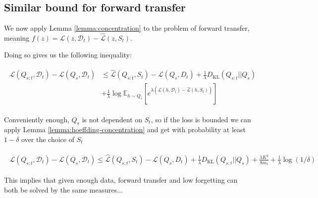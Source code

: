 \documentclass[letterpaper]{article}
\theoremstyle{definition}
\begin{document}
\subsection{Similar bound for forward transfer}

We now apply Lemma \ref{lemma:concentration} to the problem of forward transfer, meaning $f(z)=\mathcal{L}(z,\mathcal{D}_t)-\hat{\mathcal{L}}(z,S_t)$.

Doing so gives us the following inequality:

\begin{align}
\begin{split}
\mathcal{L}(Q_{s:t},\mathcal{D}_t) - \mathcal{L}(Q_{s},\mathcal{D}_t) &\leq \hat{\mathcal{L}}(Q_{s:t}, S_t) - \mathcal{L}(Q_{s}, D_t) + \frac{1}{\lambda} D_{\mathrm{KL}}(Q_{s:t}||Q_{s})\\
&+\frac{1}{\lambda}\log\mathbb{E}_{h\sim Q_{s}}\left [e^{\lambda(\mathcal{L}(h,\mathcal{D}_t)-\hat{\mathcal{L}}(h,S_t))} \right ]
\end{split}
\end{align}

Conveniently enough, $Q_s$ is not dependent on $S_t$, so if the loss is bounded we can apply Lemma \ref{lemma:hoeffding-concentration} and get with probability at least $1-\delta$ over the choice of $S_t$

\begin{align}
\begin{split}
\mathcal{L}(Q_{s:t},\mathcal{D}_t) - \mathcal{L}(Q_{s},\mathcal{D}_t) \leq \hat{\mathcal{L}}(Q_{s:t}, S_t) - \mathcal{L}(Q_{s}, D_t) + \frac{1}{\lambda} D_{\mathrm{KL}}(Q_{s:t}||Q_{s})+\frac{\lambda K^2}{8m_t}+\frac{1}{\lambda}\log(1/\delta)
\end{split}
\end{align}

This implies that given enough data, forward transfer and low forgetting can both be solved by the same measures...


\end{document}
